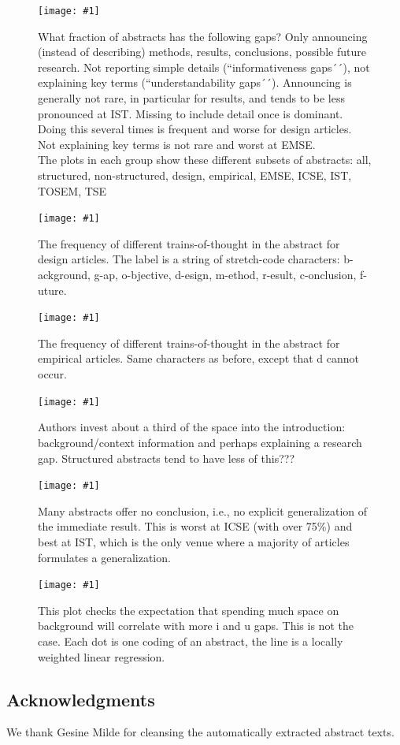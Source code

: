 \documentclass[10pt,journal,compsoc]{IEEEtran}
\newcommand{\Plot}[2]{%
	\begin{figure}[!t]%
		\centering\texttt{[image: \#1]}%
		\vspace{-4mm}\caption{#2}\label{#1}%
	\end{figure}}
\newcommand{\Plotwide}[2]{%
	\begin{figure}%
		\centering\texttt{[image: \#1]}%
		\vspace{-4mm}\caption{#2}\label{#1}%
    \end{figure}}
\begin{document}
\Plotwide{nonzerofractionbar_xletgroups_missinginfofractions}{%
	What fraction of abstracts has the following gaps?
	Only announcing (instead of describing) methods, results, conclusions, possible future research.
	Not reporting simple details (``informativeness gaps´´), not explaining key terms (``understandability gaps´´).
	Announcing is generally not rare, in particular for results, and tends to be less pronounced
	at IST. 
	Missing to include detail once is dominant.
	Doing this several times is frequent and worse for design articles.
	Not explaining key terms is not rare and worst at EMSE.\\
	The plots in each group show these different subsets of abstracts:
	all, structured, non-structured, design, empirical, EMSE, ICSE, IST, TOSEM, TSE}
\Plot{ab_topicstructure_freqs_design}{%
  The frequency of different trains-of-thought in the abstract for design articles.
  The label is a string of stretch-code characters:
  b-ackground, g-ap, o-bjective, d-esign, m-ethod, r-esult, c-onclusion, f-uture.}
\Plot{ab_topicstructure_freqs_empir}{%
	The frequency of different trains-of-thought in the abstract for empirical articles.
	Same characters as before, except that d cannot occur.}
\Plot{boxplots_fraction_introduction}{%
	Authors invest about a third of the space into the introduction:
	background/context information and perhaps explaining a research gap.
	Structured abstracts tend to have less of this???}
\Plot{boxplots_fraction_conclusion}{%
	Many abstracts offer no conclusion, i.e., no explicit generalization of the immediate result.
	This is worst at ICSE (with over 75\%)
	and best at IST, which is the only venue where a majority of articles formulates a generalization.}
\Plot{lowess_gaps_by_fracintro}{%
	This plot checks the expectation that spending much space on background
	will correlate with more i and u gaps.
	This is not the case.
	Each dot is one coding of an abstract, 
	the line is a locally weighted linear regression.}



\subsection{Acknowledgments}
\noindent We thank Gesine Milde for cleansing the automatically extracted abstract texts.
	


	

\end{document}
